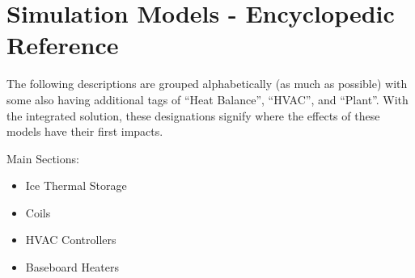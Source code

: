 \chapter{Simulation Models - Encyclopedic Reference}\label{simulation-models---encyclopedic-reference}

The following descriptions are grouped alphabetically (as much as possible) with some also having additional tags of ``Heat Balance'', ``HVAC'', and ``Plant''. With the integrated solution, these designations signify where the effects of these models have their first impacts.

Main Sections:

\begin{itemize}
  \tightlist
  \item Ice Thermal Storage
  \item Coils
  \item HVAC Controllers
  \item Baseboard Heaters 
\end{itemize}
